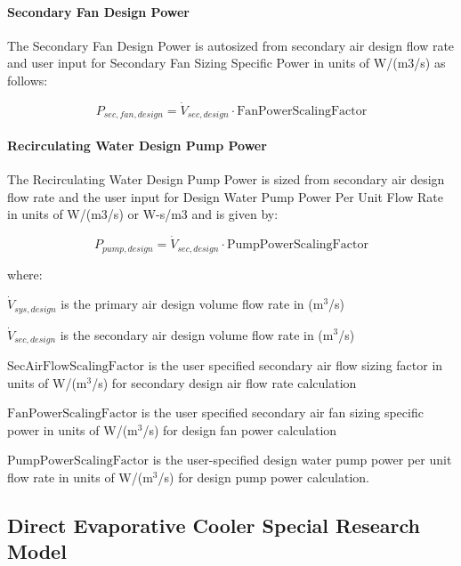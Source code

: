 \paragraph{Secondary Fan Design Power}\label{secondary-fan-design-power}

The Secondary Fan Design Power is autosized from secondary air design flow rate and user input for Secondary Fan Sizing Specific Power in units of W/(m3/s) as follows:

\begin{equation}
P_{sec,fan,design} = \dot{V}_{sec,design}\cdot\text{FanPowerScalingFactor}
\end{equation}

\paragraph{Recirculating Water Design Pump Power}\label{recirculating-water-design-pump-power}

The Recirculating Water Design Pump Power is sized from secondary air design flow rate and the user input for Design Water Pump Power Per Unit Flow Rate in units of W/(m3/s) or W-s/m3 and is given by:

\begin{equation}
P_{pump,design} = \dot{V}_{sec,design}\cdot\text{PumpPowerScalingFactor}
\end{equation}

where:

\(\dot{V}_{sys,design}\) is the primary air design volume flow rate in (m\(^{3}\)/s)

\(\dot{V}_{sec,design}\) is the secondary air design volume flow rate in (m\(^{3}\)/s)

\(\text{SecAirFlowScalingFactor}\) is the user specified secondary air flow sizing factor in units of W/(m\(^{3}\)/s) for secondary design air flow rate calculation

\(\text{FanPowerScalingFactor}\) is the user specified secondary air fan sizing specific power in units of W/(m\(^{3}\)/s) for design fan power calculation

\(\text{PumpPowerScalingFactor}\) is the user-specified design water pump power per unit flow rate in units of W/(m\(^{3}\)/s) for design pump power calculation.

\subsection{Direct Evaporative Cooler Special Research Model}\label{direct-evaporative-cooler-special-research-model}

